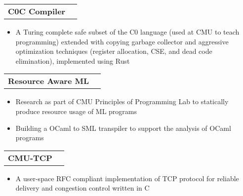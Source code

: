 \documentclass[12pt]{article}
\makeatletter
\newcommand{\resumeItem}[1]{
  \item\small{
    {#1}
  } 
  \vspace{-3pt}
}
\newcommand{\resumeProjectHeading}[2]{

    \vspace{-1pt}\item
    \begin{tabular*}{0.97\textwidth}[t]{l@{\extracolsep{\fill}}r}
      \small#1 & \small#2 \\ 
    \end{tabular*}
}
\newcommand{\resumeItemListStart}{\begin{itemize}\vspace{-8pt}}
\newcommand{\resumeItemListEnd}{\end{itemize}\vspace{-8pt}}
\makeatother
\begin{document}


        \resumeProjectHeading
         {\textbf{C0C Compiler}}{}
            \resumeItemListStart
              \resumeItem{A Turing complete safe subset of the C0 language (used at CMU to teach programming) extended with copying garbage collector and aggressive optimization techniques (register allocation, CSE, and dead code elimination), implemented using Rust}
            \resumeItemListEnd

  
        
        \resumeProjectHeading       
          {\textbf{Resource Aware ML}}{}
            \resumeItemListStart
              \resumeItem{Research as part of CMU Principles of Programming Lab to statically produce resource usage of ML programs}
              \resumeItem{Building a OCaml to SML transpiler to support the analysis of OCaml programs}
            \resumeItemListEnd

            
        \resumeProjectHeading
         {\textbf{CMU-TCP}}{}
            \resumeItemListStart
              \resumeItem{A user-space RFC compliant implementation of TCP protocol for reliable delivery and congestion control written in C}
            \resumeItemListEnd

       
        

         
       

\end{document}

